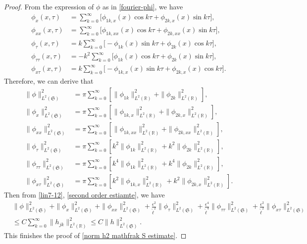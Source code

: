 \documentclass[10pt,a4paper]{amsart}
\begin{document}
\begin{proof}
 From the expression of $\phi$ as in \eqref{fourier-phi}, we have
\begin{align*}
 \phi_x(x, \tau) &= \sum_{k=0}^\infty \Big[\phi_{1k, x} (x)\cos k\tau + \phi_{2k, x} (x)\sin k\tau\Big],
 \\[2mm]
 \phi_{xx}(x, \tau) &= \sum_{k=0}^\infty \Big[\phi_{1k, xx} (x)\cos k\tau + \phi_{2k, xx} (x)\sin k\tau\Big],
 \\[2mm]
 \phi_\tau(x, \tau) & = k\sum_{k=0}^\infty \Big[-\phi_{1k} (x)\sin k\tau + \phi_{2k} (x)\cos k\tau\Big],
 \\[2mm]
 \phi_{\tau\tau}(x, \tau) & = -k^2\sum_{k=0}^\infty \Big[\phi_{1k} (x)\cos k\tau + \phi_{2k} (x)\sin k\tau\Big],
 \\[2mm]
 \phi_{x\tau}(x, \tau) & = k\sum_{k=0}^\infty \Big[-\phi_{1k, x} (x)\sin k\tau + \phi_{2k,x} (x)\cos k\tau\Big].
\end{align*}
Therefore, we can derive that
\begin{align*}
 \|\phi\|_{L^2(\mathfrak S)}^2 & =\pi \sum_{k=0}^\infty \left[\|\phi_{1k}\|^2_{L^2({\mathbb R})}+ \|\phi_{2k}\|^2_{L^2({\mathbb R})}\right],
 \\[2mm]
 \|\phi_x\|_{L^2(\mathfrak S)}^2 & = \pi\sum_{k=0}^\infty \left[\|\phi_{1k, x}\|^2_{L^2({\mathbb R})}+ \|\phi_{2k, x}\|^2_{L^2({\mathbb R})}\right],
 \\[2mm]
 \|\phi_{xx}\|_{L^2(\mathfrak S)}^2 &= \pi \sum_{k=0}^\infty \left[\|\phi_{1k, xx}\|^2_{L^2({\mathbb R})}+ \|\phi_{2k, xx}\|^2_{L^2({\mathbb R})}\right],
 \\[2mm]
 \|\phi_\tau\|_{L^2(\mathfrak S)}^2 &= \pi \sum_{k=0}^\infty \left[k^2\|\phi_{1k}\|^2_{L^2({\mathbb R})}+ k^2\|\phi_{2k}\|^2_{L^2({\mathbb R})}\right],
 \\[2mm]
 \|\phi_{\tau\tau}\|_{L^2(\mathfrak S)}^2 &=\pi \sum_{k=0}^\infty \left[k^4\|\phi_{1k}\|^2_{L^2({\mathbb R})}+ k^4\|\phi_{2k}\|^2_{L^2({\mathbb R})}\right],
 \\[2mm]
 \|\phi_{x\tau}\|_{L^2(\mathfrak S)}^2 &= \pi \sum_{k=0}^\infty \left[k^2\|\phi_{1k, x}\|^2_{L^2({\mathbb R})}+ k^2\|\phi_{2k,x}\|^2_{L^2({\mathbb R})}\right].
\end{align*}
 Then from \eqref{lin7-12}, \eqref{second order estiamte}, we have
\begin{align*}
 &\|\phi\|_{L^2(\mathfrak S)}^2 + \|\phi_x\|_{L^2(\mathfrak S)}^2 + \|\phi_{xx}\|_{L^2(\mathfrak S)}^2+ \frac{\epsilon^2}{\tilde\ell^2} \|\phi_\tau\|_{L^2(\mathfrak S)}^2 + \frac{\epsilon^4}{\tilde\ell^4} \|\phi_{\tau\tau}\|_{L^2(\mathfrak S)}^2 + \frac{\epsilon^2}{\tilde\ell^2} \|\phi_{x\tau}\|_{L^2(\mathfrak S)}^2
\nonumber\\[2mm]
 & \leq C\sum_{k=0}^\infty \|h_{jk}\|^2_{L^2({\mathbb R})} \leq  C\|h\|_{L^2(\mathfrak S)}^2.
\end{align*}
This finishes the proof of \eqref{norm h2 mathfrak S estimate}.



\end{proof}
\end{document}
